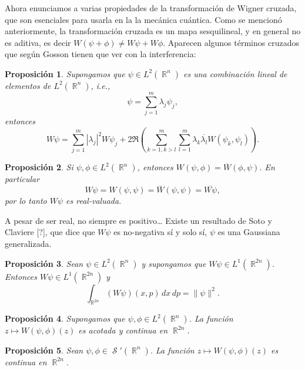 \documentclass[a4paper]{report}
\DeclareMathOperator{\R}{\mathbb{R}}
\DeclareMathOperator{\Sz}{\mathcal S}
\newtheorem{proposition}{Proposición}
\begin{document}
  Ahora enunciamos a varias propiedades de la transformación
  de Wigner cruzada, que son esenciales para usarla en la la
  mecánica cuántica. Como se mencionó anteriormente, la
  transformación cruzada es un mapa sesquilineal, y en
  general no es aditiva, es decir $W(\psi + \phi) \neq W\psi
  + W\phi$. Aparecen algunos términos cruzados que según
  Gosson tienen que ver con la interferencia:
  \begin{proposition}
    Supongamos que $\psi \in L^2(\R^{n})$ es una combinación
    lineal de elementos de $L^2(\R^{n})$, i.e.,
    \begin{equation}
      \psi = \sum_{j=1}^{m} \lambda_j \psi_j,
    \end{equation}
    entonces
    \begin{equation}
      W\psi
      = \sum_{j=1}^{m} |\lambda_j|^2 W\psi_j
      + 2 \Re\left(\sum_{k=1,k > l}^{m} \sum_{l=1}^{m}
      \lambda_k \overline{\lambda_l} W(\psi_k,
    \psi_l)\right).
    \end{equation}
  \end{proposition}

  \begin{proposition}
    Si $\psi, \phi \in L^2(\R^{n})$, entonces $W(\psi,\phi)
    = \overline{W}(\phi,\psi)$. En particular
    \[
      W\psi
      = W(\psi,\psi)
      = \overline{W}(\psi,\psi)
      = \overline{W\psi},
    \] 
    por lo tanto $W\psi$ es real-valuada. 
  \end{proposition}

  A pesar de ser real, no siempre es positivo\ldots
  Existe un resultado de Soto y Claviere [?], que dice que
  $W\psi$ es no-negativa sí y solo sí, $\psi$ es una
  Gaussiana generalizada.
  \begin{proposition}
    Sean $\psi \in L^2(\R^{n})$ y supongamos que $W\psi \in
    L^{1}(\R^{2n})$. Entonces $W\psi \in L^{1}(\R^{2n})$ y
    \begin{equation}
      \int_{\R^{2n}} (W\psi)(x,p) \, dx \, dp 
      = \|\psi\|^2.
    \end{equation}
  \end{proposition}

  \begin{proposition}
    Supongamos que $\psi, \phi \in L^2(\R^{n})$. La función
    $z \mapsto W(\psi,\phi)(z)$ es acotada y continua en
    $\R^{2n}$.
  \end{proposition}

  \begin{proposition}
    Sean $\psi,\phi \in \Sz'(\R^{n})$. La función $z
    \mapsto W(\psi,\phi)(z)$ es continua en $\R^{2n}$.
  \end{proposition}
\end{document}
